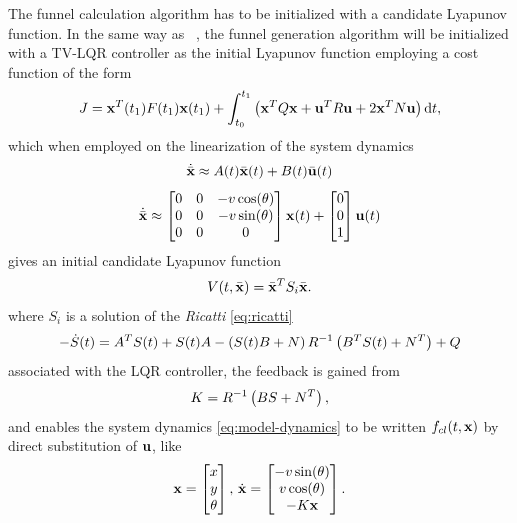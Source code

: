 The funnel calculation algorithm has to be initialized with a candidate Lyapunov
function. In the same way as
\citeauthor{majumdarRobustOnlineMotion2013}~\cite{majumdarRobustOnlineMotion2013},
the funnel generation algorithm will be initialized with a \ac{TV-LQR}
controller as the initial Lyapunov function employing a cost function of the
form
\begin{equation}
  J = \mathsf{\mathbf{x}}^{T} (t_1) F(t_1) \mathsf{\mathbf{x}} (t_1) + \int_{t_{0}}^{t_{1}} \left( \mathsf{\mathbf{x}}^{T} Q \mathsf{\mathbf{x}} + \mathsf{\mathbf{u}}^{T} R \mathsf{\mathbf{u}} + 2 \mathsf{\mathbf{x}}^T N \mathsf{\mathbf{u}} \right) \mathrm{d}t,
\end{equation}
which when employed on the linearization of the system dynamics
\begin{equation}
  \dot{\bar{\mathsf{\mathbf{x}}}} \approx A (t)\bar{\mathsf{\mathbf{x}}}(t) + B(t) \bar{\mathsf{\mathbf{u}}}(t)
\end{equation}
\begin{equation}
  \dot{\bar{\vect{x}}} \approx %
  \begin{bmatrix}
    0 & 0 & -v\cos(\theta) \\
    0 & 0 & -v\sin(\theta) \\
    0 & 0 & 0 \\
  \end{bmatrix} %
  \vect{x} (t) %
  + %
  \begin{bmatrix}
    0 \\ 0 \\ 1
  \end{bmatrix} %
  \vect{u}(t)
\end{equation} 
gives an initial candidate Lyapunov function
\begin{equation}
  V(t,\bar{\mathsf{\mathbf{x}}}) = {\bar{\mathsf{\mathbf{x}}}}^{T} S_{i}\bar{\mathsf{\mathbf{x}}}.
\end{equation}
where \(S_{i}\) is a solution of the \textit{Ricatti} \cref{eq:ricatti}
\begin{equation}
  \label{eq:ricatti}
  - \dot{S}(t) = A^{T} S(t) +S(t) A - \left( S(t) B + N \right) R^{-1}\left( B^{T} S(t) + N^{T} \right) + Q
\end{equation} 
associated with the \ac{LQR} controller, the feedback is gained from
\[
  K = R^{-1}\left( B S + N^T \right),
\]
and enables the system dynamics \cref{eq:model-dynamics} to be written
\(f_{cl}(t,\mathsf{\mathbf{x}})\) by direct substitution of \(\mathsf{\mathbf{u}}\), like
\begin{equation}
  \label{eq:model-dynamics-cl}
  \mathsf{\mathbf{x}} =
  \begin{bmatrix}
    x \\ y \\ \theta \\
  \end{bmatrix}, \, \dot{\mathsf{\mathbf{x}}} =
  \begin{bmatrix}
    -v \sin(\theta) \\
    v \cos(\theta) \\
    -K\mathsf{\mathbf{x}} \\
  \end{bmatrix}.
\end{equation}

